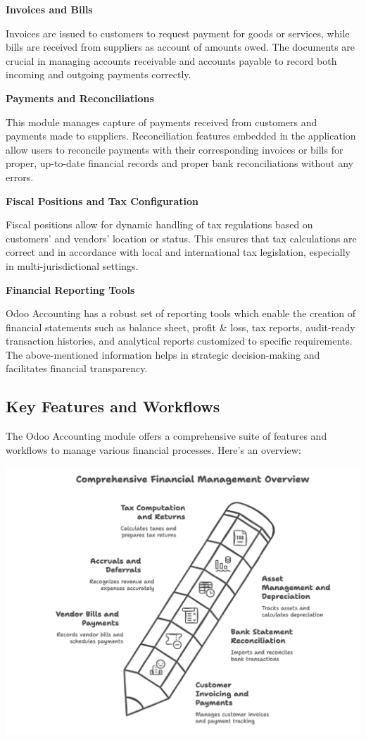 \documentclass[11pt,a4paper]{article}
\begin{document}
\noindent\textbf{Invoices and Bills}

\noindent Invoices are issued to customers to request payment for goods or services, while bills are received from suppliers as account of amounts owed. The documents are crucial in managing accounts receivable and accounts payable to record both incoming and outgoing payments correctly.
\medskip

\noindent\textbf{Payments and Reconciliations}

\noindent This module manages capture of payments received from customers and payments made to suppliers. Reconciliation features embedded in the application allow users to reconcile payments with their corresponding invoices or bills for proper, up-to-date financial records and proper bank reconciliations without any errors.
\medskip

\noindent\textbf{Fiscal Positions and Tax Configuration}

\noindent Fiscal positions allow for dynamic handling of tax regulations based on customers' and vendors' location or status. This ensures that tax calculations are correct and in accordance with local and international tax legislation, especially in multi-jurisdictional settings.
\medskip

\noindent\textbf{Financial Reporting Tools}

\noindent Odoo Accounting has a robust set of reporting tools which enable the creation of financial statements such as balance sheet, profit \& loss, tax reports, audit-ready transaction histories, and analytical reports customized to specific requirements. The above-mentioned information helps in strategic decision-making and facilitates financial transparency.

\subsection{Key Features and Workflows}
The Odoo Accounting module offers a comprehensive suite of features and workflows to manage various financial processes. Here's an overview:

\begin{center}
    \includegraphics[width=0.8\linewidth]{diagram/comprehensive_financial_management.png}
\end{center}
\end{document}
